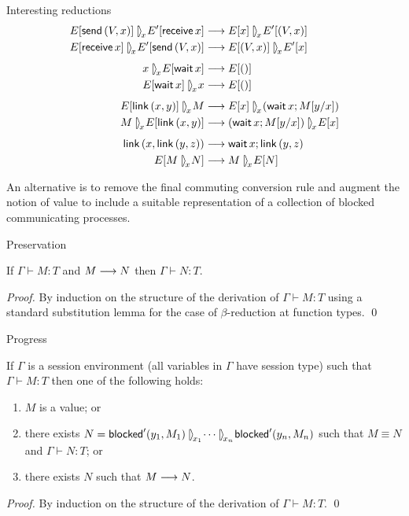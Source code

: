 \documentclass[orivec,envcountsame]{llncs}
\begin{document}
Interesting reductions
\begin{align*}
\con{E[\mkwd{send}\,(V,x)]}{x}{E'[\mkwd{receive}\,x]}
  &\rto \con{E[x]}{x}{E'[(V,x)]} \\
\con{E[\mkwd{receive}\,x]}{x}{E'[\mkwd{send}\,(V,x)]}
  &\rto \con{E[(V,x)]}{x}{E'[x]} \\[1ex]
\con{x}{x}{E[\mkwd{wait}\,x]}
  &\rto E[()] \\
\con{E[\mkwd{wait}\,x]}{x}{x}
  &\rto E[()] \\[1ex]
\con{E[\mkwd{link}\,(x,y)]}{x}{M}
  &\rto \con{E[x]}{x}{(\mkwd{wait}\,x; M[y/x])} \\
\con{M}{x}{E[\mkwd{link}\,(x,y)]}
  &\rto \con{(\mkwd{wait}\,x; M[y/x])}{x}{E[x]} \\[1ex]
\mkwd{link}\,(x,\mkwd{link}\,(y,z))
  &\rto \mkwd{wait}\,x; \mkwd{link}\,(y,z) \\
E[\con{M}{x}{N}]
  &\rto \con{M}{x}{E[N]} \\
\end{align*}

An alternative is to remove the final commuting conversion rule and augment the notion of value to
include a suitable representation of a collection of blocked communicating processes.

Preservation
\begin{theorem}
If $\Gamma \vdash M : T$ and $M \longrightarrow N$ then $\Gamma \vdash N : T$.
\end{theorem}
%
\begin{proof}
By induction on the structure of the derivation of $\Gamma \vdash M : T$ using a standard
substitution lemma for the case of $\beta$-reduction at function types. \qed
\end{proof}

Progress
\begin{theorem}
\label{thm:free-progress}
If $\Gamma$ is a session environment (all variables in $\Gamma$ have session type) such that $\Gamma
\vdash M : T$ then one of the following holds:
\begin{enumerate}
\item $M$ is a value; or
\item there exists $N = \blockedp'(y_1, M_1) \rpar{x_1} \dots \rpar{x_{n}} \blockedp'(y_{n}, M_{n})$
  such that $M \equiv N$ and $\Gamma \vdash N : T$; or
\item there exists $N$ such that $M \longrightarrow N$.
\end{enumerate}
\end{theorem}
%
\begin{proof}
By induction on the structure of the derivation of $\Gamma \vdash M : T$. \qed
\end{proof}
\end{document}
